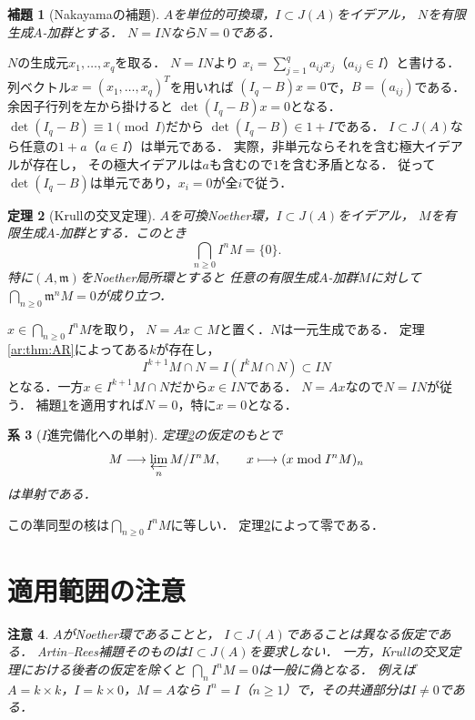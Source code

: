 \documentclass[a5paper,10pt,onecolumn]{jsarticle}
\makeatletter
\theoremstyle{mathnotetheorem}
\newtheorem{theorem}{定理}[section]
\newtheorem{lemma}[theorem]{補題}
\newtheorem{corollary}[theorem]{系}
\newtheorem{remark}[theorem]{注意}
\renewcommand{\proofname}{証明}
\renewenvironment{proof}[1][\proofname]{%
  \par\pushQED{\qed}\normalfont\topsep4\p@\@plus2\p@\relax
  \trivlist\item[\hskip\labelsep\bfseries #1]\ignorespaces
}{\popQED\endtrivlist\@endpefalse}
\makeatother
\begin{document}
\begin{lemma}[Nakayamaの補題]\label{ar:lem:nakayama}
$A$を単位的可換環，$I\subset J(A)$をイデアル，
$N$を有限生成$A$-加群とする．
$N=IN$なら$N=0$である．
\end{lemma}
\begin{proof}
$N$の生成元$x_1,\ldots,x_q$を取る．
$N=IN$より
$x_i=\sum_{j=1}^q a_{ij}x_j$（$a_{ij}\in I$）と書ける．
列ベクトル$x=(x_1,\ldots,x_q)^T$を用いれば
$(I_q-B)x=0$で，$B=(a_{ij})$である．
余因子行列を左から掛けると
$\det(I_q-B)x=0$となる．
$\det(I_q-B)\equiv1\pmod I$だから
$\det(I_q-B)\in1+I$である．
$I\subset J(A)$なら任意の$1+a$（$a\in I$）は単元である．
実際，非単元ならそれを含む極大イデアルが存在し，
その極大イデアルは$a$も含むので$1$を含む矛盾となる．
従って$\det(I_q-B)$は単元であり，$x_i=0$が全$i$で従う．
\end{proof}

\begin{theorem}[Krullの交叉定理]\label{ar:thm:krull}
$A$を可換Noether環，$I\subset J(A)$をイデアル，
$M$を有限生成$A$-加群とする．このとき
\[
 \bigcap_{n\ge0}I^nM=\{0\}.
\]
特に$(A,\mathfrak m)$をNoether局所環とすると
任意の有限生成$A$-加群$M$に対して
$\bigcap_{n\ge0}\mathfrak m^nM=0$が成り立つ．
\end{theorem}
\begin{proof}
$x\in\bigcap_{n\ge0}I^nM$を取り，
$N=Ax\subset M$と置く．$N$は一元生成である．
定理\ref{ar:thm:AR}によってある$k$が存在し，
\[
 I^{k+1}M\cap N=I(I^kM\cap N)\subset IN
\]
となる．一方$x\in I^{k+1}M\cap N$だから$x\in IN$である．
$N=Ax$なので$N=IN$が従う．
補題\ref{ar:lem:nakayama}を適用すれば$N=0$，特に$x=0$となる．
\end{proof}

\begin{corollary}[$I$進完備化への単射]\label{ar:cor:injective}
定理\ref{ar:thm:krull}の仮定のもとで
\[
 M\longrightarrow\varprojlim_n M/I^nM,\qquad
 x\longmapsto(x\bmod I^nM)_n
\]
は単射である．
\end{corollary}
\begin{proof}
この準同型の核は$\bigcap_{n\ge0}I^nM$に等しい．
定理\ref{ar:thm:krull}によって零である．
\end{proof}

\section{適用範囲の注意}
\begin{remark}
$A$がNoether環であることと，
$I\subset J(A)$であることは異なる仮定である．
Artin--Rees補題そのものは$I\subset J(A)$を要求しない．
一方，Krullの交叉定理における後者の仮定を除くと
$\bigcap_n I^nM=0$は一般に偽となる．
例えば$A=k\times k$，$I=k\times0$，$M=A$なら
$I^n=I$（$n\ge1$）で，その共通部分は$I\ne0$である．
\end{remark}
\end{document}
